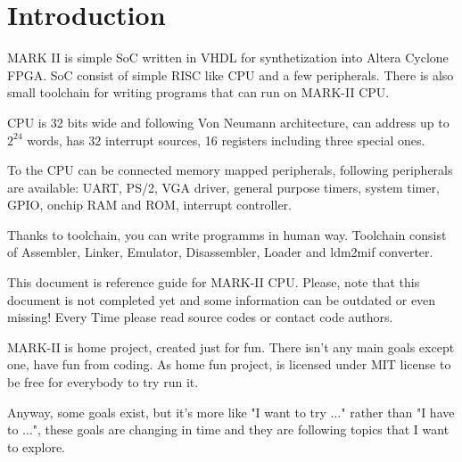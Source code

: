 \section{Introduction}

MARK II is simple SoC written in VHDL for synthetization into Altera Cyclone
FPGA. SoC consist of simple RISC like CPU and a few peripherals. There is also
small toolchain for writing programs that can run on MARK-II CPU.

CPU is 32 bits wide and following Von Neumann architecture, can address up to
$2^{24}$ words, has 32 interrupt sources, 16 registers including three special
ones.

To the CPU can be connected memory mapped peripherals, following peripherals
are available: UART, PS/2, VGA driver, general purpose timers, system timer,
GPIO, onchip RAM and ROM, interrupt controller.

Thanks to toolchain, you can write programms in human way. Toolchain consist of
Assembler, Linker, Emulator, Disassembler, Loader and ldm2mif converter.

This document is reference guide for MARK-II CPU. Please, note that this
document is not completed yet and some information can be outdated or even
missing! Every Time please read source codes or contact code authors.

MARK-II is home project, created just for fun. There isn't any main goals except
one, have fun from coding. As home fun project, is licensed under MIT license to
be free for everybody to try run it.

Anyway, some goals exist, but it's more like "I want to try ..." rather than
"I have to ...", these goals are changing in time and they are following topics
that I want to explore.

